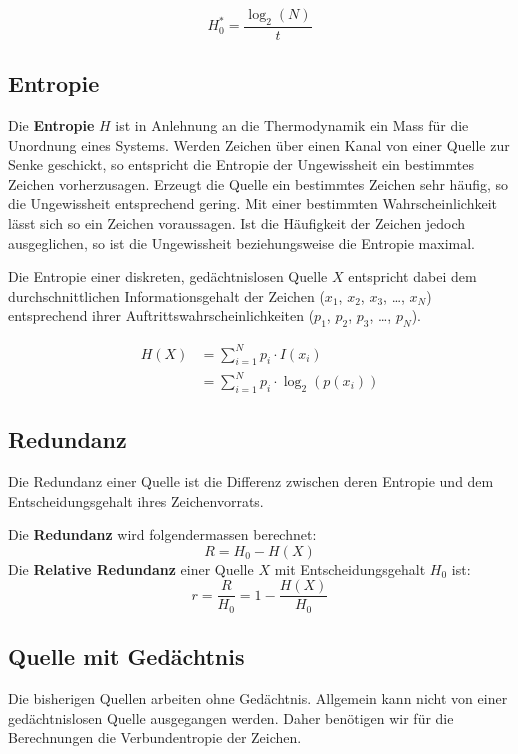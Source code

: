 \begin{displaymath}
	H^*_0=\frac{\log_2(N)}{t}
\end{displaymath}


\subsection{Entropie}

Die \textbf{Entropie} $H$ ist in Anlehnung an die Thermodynamik ein Mass für die
Unordnung eines Systems. Werden Zeichen über einen Kanal von einer Quelle zur
Senke geschickt, so entspricht die Entropie der Ungewissheit ein bestimmtes
Zeichen vorherzusagen. Erzeugt die Quelle ein bestimmtes Zeichen sehr häufig, so
die Ungewissheit entsprechend gering. Mit einer bestimmten Wahrscheinlichkeit
lässt sich so ein Zeichen voraussagen. Ist die Häufigkeit der Zeichen jedoch
ausgeglichen, so ist die Ungewissheit beziehungsweise die Entropie maximal. 

Die Entropie einer diskreten, gedächtnislosen Quelle $X$ entspricht dabei dem
durchschnittlichen Informationsgehalt der Zeichen ($x_1$, $x_2$, $x_3$, \ldots,
$x_N$) entsprechend ihrer Auftrittswahrscheinlichkeiten ($p_1$, $p_2$, $p_3$,
\ldots, $p_N$). 

\begin{align*}
H(X)& =\sum\limits_{i=1}^N p_i \cdot I(x_i) \\
& =\sum\limits_{i=1}^N p_i \cdot \log_2\left(p(x_i)\right)
\end{align*}


\subsection{Redundanz}

Die Redundanz einer Quelle ist die Differenz zwischen deren Entropie und dem
Entscheidungsgehalt ihres Zeichenvorrats.

Die \textbf{Redundanz} wird folgendermassen berechnet:
\[
	R = H_0 - H(X)
\]
Die \textbf{Relative Redundanz} einer Quelle $X$ mit Entscheidungsgehalt $H_0$
ist:
\[
	r = \frac{R}{H_0} = 1 - \frac{H(X)}{H_0}
\]


\subsection{Quelle mit Gedächtnis}

Die bisherigen Quellen arbeiten ohne Gedächtnis. Allgemein kann nicht von einer
gedächtnislosen Quelle ausgegangen werden. Daher benötigen wir für die
Berechnungen die Verbundentropie der Zeichen.

